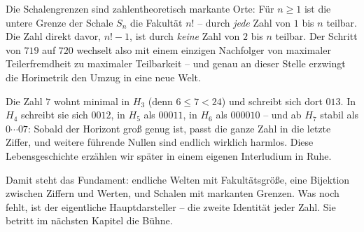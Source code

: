 Die Schalengrenzen sind zahlentheoretisch markante Orte: Für
$n\ge1$ ist die untere Grenze der Schale $S_n$ die Fakultät $n!$ --
durch \emph{jede} Zahl von $1$ bis $n$ teilbar. Die Zahl direkt
davor, $n!-1$, ist durch \emph{keine} Zahl von $2$ bis $n$ teilbar.
Der Schritt von $719$ auf $720$ wechselt also mit einem einzigen
Nachfolger von maximaler Teilerfremdheit zu maximaler Teilbarkeit --
und genau an dieser Stelle erzwingt die Horimetrik den Umzug in eine
neue Welt.

\begin{beispiel}
Die Zahl $7$ wohnt minimal in $H_3$ (denn $6\le7<24$) und schreibt
sich dort $013$. In $H_4$ schreibt sie sich $0012$, in $H_5$ als
$00011$, in $H_6$ als $000010$ -- und ab $H_7$ stabil als
$0\cdots07$: Sobald der Horizont groß genug ist, passt die ganze
Zahl in die letzte Ziffer, und weitere führende Nullen sind endlich
wirklich harmlos. Diese Lebensgeschichte erzählen wir später in
einem eigenen Interludium in Ruhe.
\end{beispiel}

Damit steht das Fundament: endliche Welten mit Fakultätsgröße, eine
Bijektion zwischen Ziffern und Werten, und Schalen mit markanten
Grenzen. Was noch fehlt, ist der eigentliche Hauptdarsteller -- die
zweite Identität jeder Zahl. Sie betritt im nächsten Kapitel die
Bühne.
